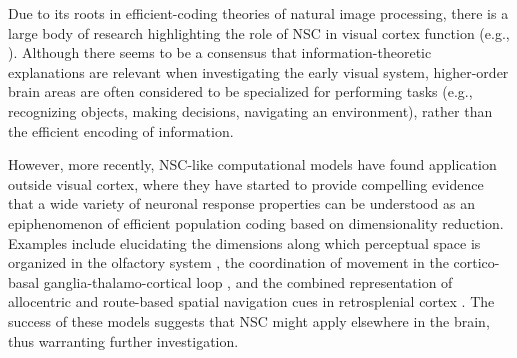 Due to its roots in efficient-coding theories of natural image processing,
there is a large body of research highlighting the role of \ac{NSC} in
visual cortex function
(e.g., \cite{Barlow1961,OlshausenField1996,Hoyer2003,BenHamed2003}).
Although there seems to be a consensus that 
information-theoretic explanations are relevant 
when investigating the early visual system,
higher-order brain areas are often considered to be specialized for
performing tasks
(e.g., recognizing objects, making decisions, navigating an environment),
rather than the efficient encoding of information.

However, more recently, 
\ac{NSC}-like computational models have found application outside visual cortex,
where they have started to provide compelling evidence that a wide variety of
neuronal response properties can be understood as an epiphenomenon
of efficient population coding based on dimensionality reduction.
Examples include elucidating the dimensions along which perceptual space
is organized in the olfactory system
\cite{MorenoBoteDrugowitsch2015,Castro2013},
the coordination of movement in the cortico-basal ganglia-thalamo-cortical loop
\cite{BarGad2000,BarGad2003_Review},
and the combined representation of allocentric and route-based 
spatial navigation cues
in retrosplenial cortex \cite{Rounds2018}.
The success of these models suggests that \ac{NSC}
might apply elsewhere in the brain, 
thus warranting further investigation.




